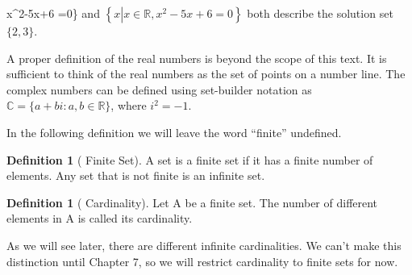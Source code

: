 \documentclass[10pt,]{book}
\theoremstyle{plain}
\theoremstyle{definition}
\newtheorem{definition}[theorem]{Definition}
\theoremstyle{definition}
\theoremstyle{definition}
\theoremstyle{definition}
\begin{document}
 \mid x^{2}-5x+6 =0\}\) and \(\left\{x \left| x\in \mathbb{R}, x^{2 }-5x+6\right.=0\right\}\) both describe the solution set \(\{2, 3\}\). 
%
\par
A proper definition of the real numbers is beyond the scope of this text. It is sufficient to think of the real numbers as the set of points on a
number line. The complex numbers can be defined using set-builder notation as \(\mathbb{C} = \{a + b i:a, b \in \mathbb{R}\}\), where \(i^2 = -1\).  %
\par
In the following definition we will leave the word ``finite'' undefined.   
%
\begin{definition}[ Finite Set]\label{finite-set}
A set is a finite set if it has a finite number of elements. Any set that is not finite is an infinite set.%
\end{definition}
\begin{definition}[ Cardinality]\label{cardinality.}
\label{notation-3}
Let A be a finite set. The number of different elements in A is called its cardinality.%
\end{definition}
\par
As we will see later, there are different infinite cardinalities. We can't make this distinction until Chapter 7, so we will restrict cardinality to finite sets for now.%
\typeout{************************************************}
\typeout{************************************************}
\end{document}

